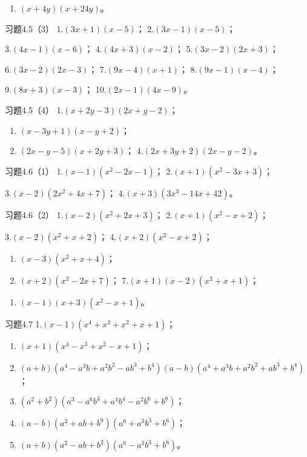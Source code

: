 \begin{enumerate}[start=20]
\item
  \((x + 4y)(x + 24y)\)。
\end{enumerate}

习题4.5（3） 1.\((3x + 1)(x - 5)\)； 2.\((3x - 1)(x - 5)\)；

3.\((4x - 1)(x - 6)\)； 4.\((4x + 3)(x - 2)\)； 5.\((3x - 2)(2x + 3)\)；

6.\((3x - 2)(2x - 3)\)； 7.\((9x - 4)(x + 1)\)； 8.\((9x - 1)(x - 4)\)；

9.\((8x + 3)(x - 3)\)； 10.\((2x - 1)(4x - 9)\)。

习题4.5（4） 1.\((x + 2y - 3)(2x + y - 2)\)；
\begin{enumerate}[start=2]
\item
  \((x - 3y + 1)(x - y + 2)\)；
\item
  \((2x - y - 5)(x + 2y + 3)\)； 4.\((2x + 3y + 2)(2x - y - 2)\)。
\end{enumerate}

习题4.6（1） 1.\((x - 1)(x^2 - 2x - 1)\)； 2.\((x + 1)(x^2 - 3x + 3)\)；

3.\((x - 2)(2x^{2} + 4x + 7)\)； 4.\((x + 3)(3x^{3} - 14x + 42)\)。

习题4.6（2） 1.\((x - 2)(x^2 + 2x + 3)\)； 2.\((x + 1)(x^2 - x + 2)\)；

3.\((x - 2)(x^{2} + x + 2)\)； 4.\((x + 2)(x^{2} - x + 2)\)；
\begin{enumerate}[start=5]
\item
  \((x - 3)(x^{2} + x + 4)\)；
\item
  \((x + 2)(x^2 - 2x + 7)\)； 7.\((x + 1)(x - 2)(x^2 + x + 1)\)；
\end{enumerate}

\begin{enumerate}[start=8]
\item
  \((x - 1)(x + 3)(x^2 - x + 1)\)。
\end{enumerate}

习题4.7 1.\((x - 1)(x^4 + x^3 + x^2 + x + 1)\)；

\begin{enumerate}[start=2]
\item
  \((x + 1)(x^4 - x^3 + x^2 - x + 1)\)；
\item
  \((a + b)(a^4 - a^3b + a^2b^2 - ab^3 + b^4)(a - b)(a^4 + a^3b + a^2b^2 + ab^3 + b^4)\)；
\item
  \((a^2 + b^2)(a^3 - a^6b^3 + a^4b^4 - a^2b^6 + b^8)\)；
\item
  \((a - b)(a^2 + ab + b^9)(a^6 + a^3b^3 + b^6)\)；
\item
  \((a + b)(a^2 - ab + b^2)(a^6 - a^3b^3 + b^6)\)。
\end{enumerate}

